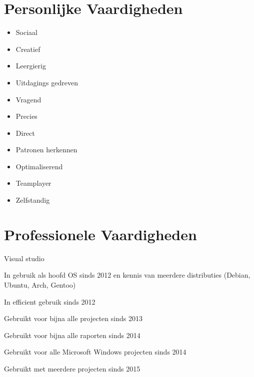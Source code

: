 \documentclass[]{friggeri-cv} %
\begin{document}

\section{Personlijke Vaardigheden}

\begin{multicols}{2}
   \begin{itemize}
      \item Sociaal
      \item Creatief
      \item Leergierig
      \item Uitdagings gedreven
      \item Vragend
      \item Precies
      \item Direct
      \item Patronen herkennen
      \item Optimaliserend
      \item Teamplayer
      \item Zelfstandig
   \end{itemize}
\end{multicols}


\section{Professionele Vaardigheden}

\begin{labeling}{Visual studio}
\item [Linux] In gebruik als hoofd OS sinds 2012 en kennis van meerdere distributies (Debian, Ubuntu, Arch, Gentoo)
\item [Vim] In efficient gebruik sinds 2012
\item [Git] Gebruikt voor bijna alle projecten sinds 2013
\item [\LaTeX] Gebruikt voor bijna alle raporten sinds 2014
\item [Visual studio] Gebruikt voor alle Microsoft Windows projecten sinds 2014
\item [CVS] Gebruikt met meerdere projecten sinds 2015
\end{labeling}

\end{document}
